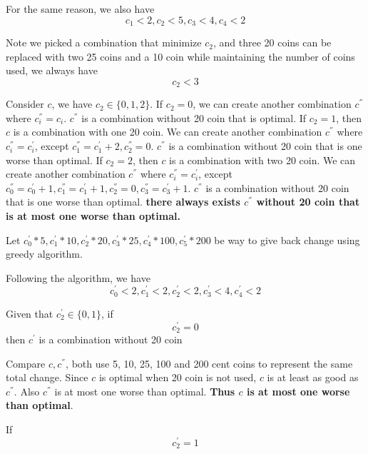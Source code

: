 \documentclass[12pt]{article}
\begin{document}
\begin{enumerate}
\begin{itemize}
For the same reason, we also have
\begin{equation}
c_{1} < 2, c_{2} < 5, c_{3} < 4, c_{4} < 2
\end{equation}

Note we picked a combination that minimize $c_{2}$, and three 20 coins can be replaced with two 25 coins and a 10 coin while maintaining the number of coins used, we always have
\begin{equation}
c_{2} < 3
\end{equation}

Consider $c$, we have $c_{2} \in \{0, 1, 2\}$. If $c_{2} = 0$, we can create another combination $c^{''}$ where $c_{i}^{''} = c_{i}$. $c^{''}$ is a combination without 20 coin that is optimal. If $c_{2} = 1$, then $c$ is a combination with one 20 coin. We can create another combination $c^{''}$ where $c_{i}^{''} = c_{i}^{'}$, except $c_{1}^{''} = c_{1}^{'} + 2, c_{2}^{''} = 0$. $c^{''}$ is a combination without 20 coin that is one worse than optimal. If $c_{2} = 2$, then $c$ is a combination with two 20 coin. We can create another combination $c^{''}$ where $c_{i}^{''} = c_{i}^{'}$, except $c_{0}^{''} = c_{0}^{'} + 1, c_{1}^{''} = c_{1}^{'} + 1, c_{2}^{''} = 0, c_{3}^{''} = c_{3}^{'} + 1$. $c^{''}$ is a combination without 20 coin that is one worse than optimal. \textbf{there always exists $c^{''}$ without 20 coin that is at most one worse than optimal.}

Let
$c_{0}^{'} * 5, c_{1}^{'} * 10, c_{2}^{'} * 20, c_{3}^{'} * 25, c_{4}^{'} * 100, c_{5}^{'} * 200$
be way to give back change using greedy algorithm.

Following the algorithm, we have
\begin{equation}
c_{0}^{'} < 2, c_{1}^{'} < 2, c_{2}^{'} < 2, c_{3}^{'} < 4, c_{4}^{'} < 2
\end{equation}

Given that $c_{2}^{'} \in \{0, 1\}$, if
\begin{equation}
c_{2}^{'} = 0
\end{equation}
then $c^{'}$ is a combination without 20 coin

Compare $c, c^{''}$, both use 5, 10, 25, 100 and 200 cent coins to represent the same total change. Since $c$ is optimal when 20 coin is not used, $c$ is at least as good as $c^{''}$. Also $c^{''}$ is at most one worse than optimal. \textbf{Thus $c$ is at most one worse than optimal}.

If
\begin{equation}
c_{2}^{'} = 1
\end{equation}


\end{itemize}
\end{enumerate}
\end{document}
